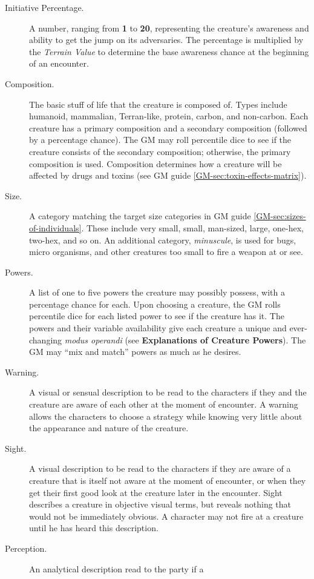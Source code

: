 \begin{description}
\item[Initiative Percentage.] A number, ranging from \textbf{1} to
  \textbf{20}, representing the creature's awareness and ability to
  get the jump on its adversaries. The percentage is multiplied by the
  \emph{Terrain Value} to determine the base awareness chance at the
  beginning of an encounter.
\item[Composition.] The basic stuff of life that the creature is
  composed of. Types include humanoid, mammalian, Terran-like,
  protein, carbon, and non-carbon. Each creature has a primary
  composition and a secondary composition (followed by a percentage
  chance).  The GM may roll percentile dice to see if the creature
  consists of the secondary composition; otherwise, the primary
  composition is used. Composition determines how a creature will be
  affected by drugs and toxins (see
  GM guide \ref{GM-sec:toxin-effects-matrix}).
\item[Size.] A category matching the target size categories in
  GM guide \ref{GM-sec:sizes-of-individuals}. These include very small, small,
  man-sized, large, one-hex, two-hex, and so on. An additional
  category, \emph{minuscule}, is used for bugs, micro organisms, and
  other creatures too small to fire a weapon at or see.
\item[Powers.] A list of one to five powers the creature may possibly
  possess, with a percentage chance for each. Upon choosing a
  creature, the GM rolls percentile dice for each listed power to see
  if the creature has it. The powers and their variable availability
  give each creature a unique and ever-changing \emph{modus operandi}
  (see \textbf{Explanations of Creature Powers}). The GM may ``mix and
  match'' powers as much as he desires.
\item[Warning.] A visual or sensual description to be read to the
  characters if they and the creature are aware of each other at the
  moment of encounter. A warning allows the characters to choose a
  strategy while knowing very little about the appearance and nature
  of the creature.
\item[Sight.] A visual description to be read to the characters if
  they are aware of a creature that is itself not aware at the moment
  of encounter, or when they get their first good look at the
  creature later in the encounter. Sight describes a creature in
  objective visual terms, but reveals nothing that would not be
  immediately obvious. A character may not fire at a creature until he
  has heard this description.
\item[Perception.] An analytical description read to the party if a

\end{description}
